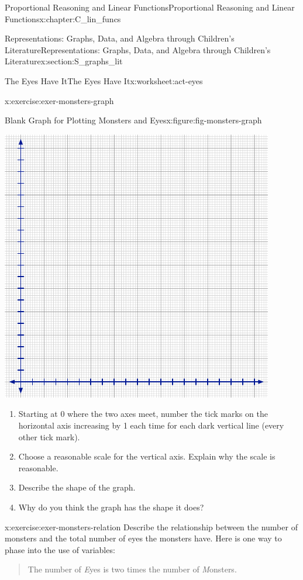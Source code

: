 \documentclass[oneside,10pt,]{book}
\numberwithin{equation}{chapter}
\begin{document}
\begin{chapterptx}{Proportional Reasoning and Linear Functions}{}{Proportional Reasoning and Linear Functions}{}{}{x:chapter:C_lin_funcs}
\begin{sectionptx}{Representations: Graphs, Data, and Algebra through Children's Literature}{}{Representations: Graphs, Data, and Algebra through Children's Literature}{}{}{x:section:S_graphs_lit}
\begin{worksheet-subsection}{The Eyes Have It}{}{The Eyes Have It}{}{}{x:worksheet:act-eyes}
\begin{divisionexercise}{2}{}{}{x:exercise:exer-monsters-graph}
\begin{figureptx}{Blank Graph for Plotting Monsters and Eyes}{x:figure:fig-monsters-graph}{}
\begin{image}{0.15}{0.7}{0.15}%
\includegraphics[width=\linewidth]{external/blank-graph.pdf}
\end{image}%
\tcblower
\end{figureptx}%
\begin{enumerate}[font=\bfseries,label=(\alph*),ref=\alph*]
\item{}Starting at 0 where the two axes meet, number the tick marks on the horizontal axis increasing by 1 each time for each dark vertical line (every other tick mark).%
\item{}Choose a reasonable scale for the vertical axis. Explain why the scale is reasonable.%
\item{}Describe the shape of the graph.%
\item{}Why do you think the graph has the shape it does?%
\end{enumerate}
\end{divisionexercise}%
\begin{divisionexercise}{3}{}{}{x:exercise:exer-monsters-relation}%
Describe the relationship between the number of monsters and the total number of eyes the monsters have. Here is one way to phase into the use of variables: \begin{quote}%
The number of \emph{E}yes is two times the number of \emph{M}onsters.%

\end{quote}
\end{divisionexercise}
\end{worksheet-subsection}
\end{sectionptx}
\end{chapterptx}
\end{document}
